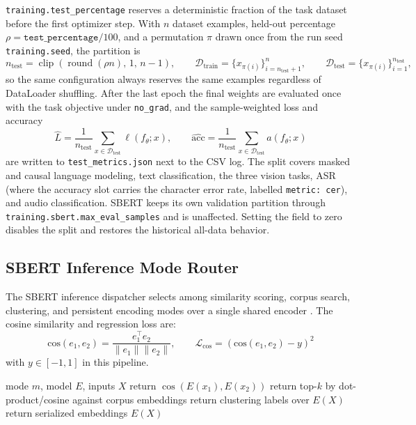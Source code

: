 \texttt{training.test\_percentage} reserves a deterministic fraction of the task dataset before the first optimizer step. With $n$ dataset examples, held-out percentage $\rho=\texttt{test\_percentage}/100$, and a permutation $\pi$ drawn once from the run seed \texttt{training.seed}, the partition is
\[
n_{\text{test}}=\operatorname{clip}\!\left(\operatorname{round}(\rho n),\,1,\,n-1\right),\qquad
\mathcal{D}_{\text{train}}=\{x_{\pi(i)}\}_{i=n_{\text{test}}+1}^{n},\qquad
\mathcal{D}_{\text{test}}=\{x_{\pi(i)}\}_{i=1}^{n_{\text{test}}} ,
\]
so the same configuration always reserves the same examples regardless of DataLoader shuffling. After the last epoch the final weights are evaluated once with the task objective under \texttt{no\_grad}, and the sample-weighted loss and accuracy
\[
\hat{L}=\frac{1}{n_{\text{test}}}\sum_{x\in\mathcal{D}_{\text{test}}}\ell(f_\theta;x),\qquad
\widehat{\text{acc}}=\frac{1}{n_{\text{test}}}\sum_{x\in\mathcal{D}_{\text{test}}}a(f_\theta;x)
\]
are written to \texttt{test\_metrics.json} next to the CSV log. The split covers masked and causal language modeling, text classification, the three vision tasks, ASR (where the accuracy slot carries the character error rate, labelled \texttt{metric: cer}), and audio classification. SBERT keeps its own validation partition through \texttt{training.sbert.max\_eval\_samples} and is unaffected. Setting the field to zero disables the split and restores the historical all-data behavior.

\subsection{SBERT Inference Mode Router}

The SBERT inference dispatcher selects among similarity scoring, corpus search, clustering, and persistent encoding modes over a single shared encoder \citep{reimers_sentence-bert_2019}. The cosine similarity and regression loss are:
\[
\text{cos}(e_1,e_2)=\frac{e_1^\top e_2}{\|e_1\|\|e_2\|},\qquad
\mathcal{L}_{\text{cos}}=\left(\text{cos}(e_1,e_2)-y\right)^2
\]
with $y\in[-1,1]$ in this pipeline.

\begin{algorithm}[t]
\caption{SBERT Inference Mode Router}
\begin{algorithmic}[1]
\Require mode $m$, model $E$, inputs $X$
    \State return $\cos(E(x_1),E(x_2))$
    \State return top-$k$ by dot-product/cosine against corpus embeddings
    \State return clustering labels over $E(X)$
\Else
    \State return serialized embeddings $E(X)$
\EndIf
\end{algorithmic}
\end{algorithm}